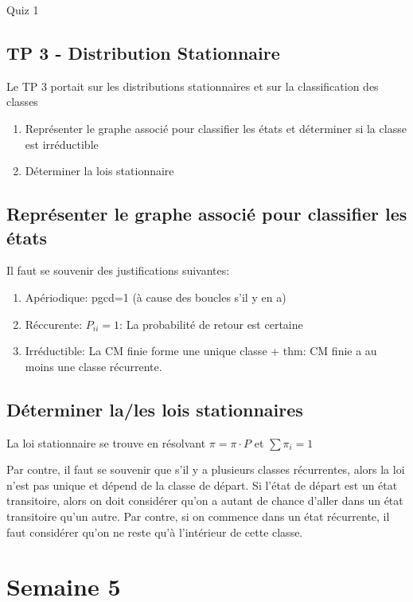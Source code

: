 \documentclass{article}
\begin{document}
Quiz 1

\subsection{TP 3 - Distribution Stationnaire}

Le TP 3 portait sur les distributions stationnaires et sur la classification
des classes

\begin{enumerate}
    \item Représenter le graphe associé pour classifier les états et déterminer
	si la classe est irréductible
    \item Déterminer la lois stationnaire
\end{enumerate}

\subsection{Représenter le graphe associé pour classifier les états}

Il faut se souvenir des justifications suivantes:
\begin{enumerate}
    \item Apériodique: pgcd=1 (à cause des boucles s'il y en a)
    \item Réccurente: $P_{ii}=1$: La probabilité de retour est certaine
    \item Irréductible: La CM finie forme une unique classe + thm: CM finie a
	au moins une classe récurrente.
\end{enumerate}

\subsection{Déterminer la/les lois stationnaires}

La loi stationnaire se trouve en résolvant $ \pi = \pi \cdot P$ et
$\sum \pi _i =1$

Par contre, il faut se souvenir que s'il y a plusieurs classes récurrentes,
alors la loi n'est pas unique et dépend de la classe de départ. Si l'état de
départ est un état transitoire, alors on doit considérer qu'on a autant de
chance d'aller dans un état transitoire qu'un autre. Par contre, si on commence
dans un état récurrente, il faut considérer qu'on ne reste qu'à l'intérieur de
cette classe.

\pagebreak
\section{Semaine 5}
\end{document}
